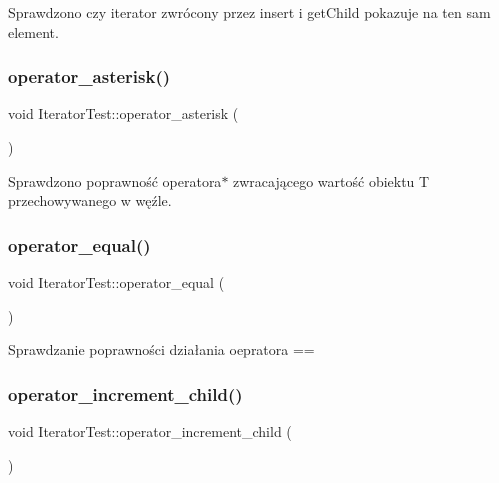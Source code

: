 Sprawdzono czy iterator zwrócony przez insert i get\+Child pokazuje na ten sam element. \mbox{\label{class_iterator_test_a7b80412e084b4a4502daddba5102e3c5}} 
\subsubsection{\texorpdfstring{operator\+\_\+asterisk()}{operator\_asterisk()}}
{\footnotesize\ttfamily void Iterator\+Test\+::operator\+\_\+asterisk (\begin{DoxyParamCaption}{ }\end{DoxyParamCaption})\hspace{0.3cm}{\ttfamily [inline]}}

Sprawdzono poprawność operatora$\ast$ zwracającego wartość obiektu T przechowywanego w węźle. \mbox{\label{class_iterator_test_a4bd66d05af2e1fc6c3d7850ccc7ac783}} 
\subsubsection{\texorpdfstring{operator\+\_\+equal()}{operator\_equal()}}
{\footnotesize\ttfamily void Iterator\+Test\+::operator\+\_\+equal (\begin{DoxyParamCaption}{ }\end{DoxyParamCaption})\hspace{0.3cm}{\ttfamily [inline]}}

Sprawdzanie poprawności działania oepratora == \mbox{\label{class_iterator_test_abd29dbcdc2be56c9e2d2185b07bb4a6e}} 
\subsubsection{\texorpdfstring{operator\+\_\+increment\+\_\+child()}{operator\_increment\_child()}}
{\footnotesize\ttfamily void Iterator\+Test\+::operator\+\_\+increment\+\_\+child (\begin{DoxyParamCaption}{ }\end{DoxyParamCaption})\hspace{0.3cm}{\ttfamily [inline]}}

